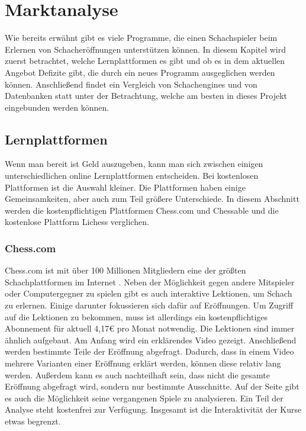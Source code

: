 
\chapter{Marktanalyse}\label{cp:marktanalyse}
Wie bereits erwähnt gibt es viele Programme, die einen Schachspieler beim Erlernen von Schacheröffnungen unterstützen können. In diesem Kapitel wird zuerst betrachtet, welche Lernplattformen es gibt und ob es in dem aktuellen Angebot Defizite gibt, die durch ein neues Programm ausgeglichen werden können. Anschließend findet ein Vergleich von Schachengines und von Datenbanken statt unter der Betrachtung, welche am besten in dieses Projekt eingebunden werden können.


\section{Lernplattformen}
Wenn man bereit ist Geld auszugeben, kann man sich zwischen einigen unterschiedlichen online Lernplattformen entscheiden. Bei kostenlosen Plattformen ist die Auswahl kleiner. Die Plattformen haben einige Gemeinsamkeiten, aber auch zum Teil größere Unterschiede. In diesem Abschnitt werden die kostenpflichtigen Plattformen Chess.com und Chessable und die kostenlose Plattform Lichess verglichen.

\subsection{Chess.com}
Chess.com ist mit über 100 Millionen Mitgliedern eine der größten Schachplattformen im Internet \cite{chesscom_chesscom_2022}. Neben der Möglichkeit gegen andere Mitspieler oder Computergegner zu spielen gibt es auch interaktive Lektionen, um Schach zu erlernen. Einige darunter fokussieren sich dafür auf Eröffnungen. Um Zugriff auf die Lektionen zu bekommen, muss ist allerdings ein kostenpflichtiges Abonnement für aktuell 4,17€ pro Monat notwendig. Die Lektionen sind immer ähnlich aufgebaut. Am Anfang wird ein erklärendes Video gezeigt. Anschließend werden bestimmte Teile der Eröffnung abgefragt. Dadurch, dass in einem Video mehrere Varianten einer Eröffnung erklärt werden, können diese relativ lang werden. Außerdem kann es auch nachteilhaft sein, dass nicht die gesamte Eröffnung abgefragt wird, sondern nur bestimmte Ausschnitte. Auf der Seite gibt es auch die Möglichkeit seine vergangenen Spiele zu analysieren. Ein Teil der Analyse steht kostenfrei zur Verfügung. Insgesamt ist die Interaktivität der Kurse etwas begrenzt.

